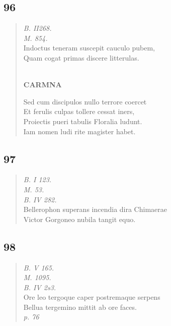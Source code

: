 \documentclass[11pt, a4paper]{report}
\begin{document}
            \subsection*{96}
      \begin{verse}
      \textit{B. II268.} \\ \textit{M. 854.} \\ Indoctus teneram suscepit cauculo pubem, \\ Quam cogat primas discere litterulas. \\ 
        ﻿\pagebreak 
    \begin{center} \textbf{CARMNA} \end{center} \marginpar{[124]} Sed cum discipulos nullo terrore coercet \\ Et ferulis culpas tollere cessat iners, \\ Proiectis pueri tabulis Floralia ludunt. \\ Iam nomen ludi rite magister habet. \\ 
      \end{verse}
  
            \subsection*{97}
      \begin{verse}
      \textit{B. I 123.} \\ \textit{M. 53.} \\ \textit{B. IV 282.} \\ Bellerophon superans incendia dira Chimaerae \\ Victor Gorgoneo nubila tangit equo. \\ 
      \end{verse}
  
            \subsection*{98}
      \begin{verse}
      \textit{B. V 165.} \\ \textit{M. 1095.} \\ \textit{B. IV 2s3.} \\ Ore leo tergoque caper postremaque serpens \\ Bellua tergemino mittit ab ore faces. \\ \textit{p. 76} \\ 
      \end{verse}
  
\end{document}
